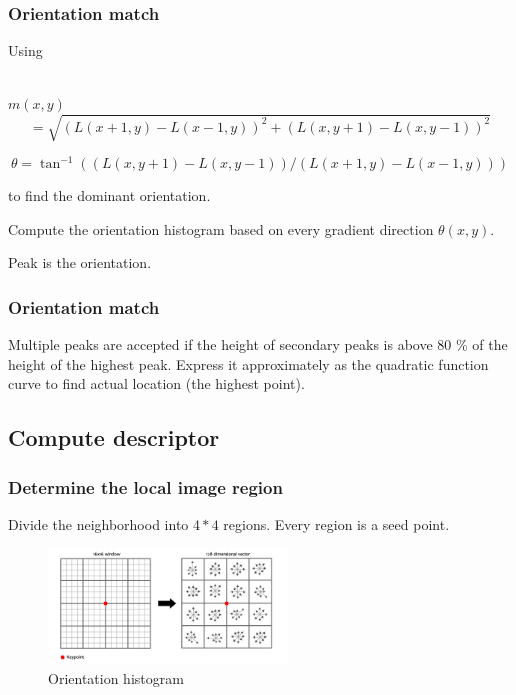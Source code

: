 \documentclass[notheorems, serif, table, compress]{beamer}  %
\begin{document}
\begin{frame}[fragile]
\frametitle{Orientation match}%

Using

\quad\\
$m(x,y)$
\begin{equation}
=\sqrt{(L(x+1,y)-L(x-1,y))^{2}+(L(x,y+1)-L(x,y-1))^{2}}
\end{equation}

\begin{equation}
\theta =\tan^{-1}((L(x,y+1)-L(x,y-1))/(L(x+1,y)-L(x-1,y)))
\end{equation}

to find the dominant orientation. 


Compute the orientation histogram based on every gradient direction $\theta(x,y)$. %

Peak is the orientation. 



\end{frame}
\begin{frame}[fragile]
\frametitle{Orientation match}%

Multiple peaks are accepted if the height of secondary peaks is above 80 \% of the height of the highest peak. Express it approximately as the quadratic function curve to find actual location (the highest point).%

\end{frame}
\subsection{Compute descriptor}
\begin{frame}[fragile]
\frametitle{Determine the local image region}%
Divide the neighborhood into $4*4$ regions. Every region is a seed point.

 
\begin{figure}[!ht]
  \centering\includegraphics[width=2.5in]{128wei.png}
  \caption{Orientation histogram}
 \label{128}
  \end{figure}

\end{frame}
\end{document}
